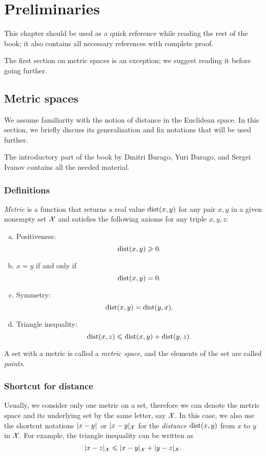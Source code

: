 \chapter*{Preliminaries}

This chapter should be used as a quick reference while reading the rest of the book;
it also contains all necessary references with complete proof.

The first section on metric spaces is an exception;
we suggest reading it before going further.

\section{Metric spaces}\label{sec:metric-spcaes}

We assume familiarity with the notion of distance in the 
Euclidean space.
In this section, we briefly discuss its generalization and fix notations that will be used further.

The introductory part of the book by Dmitri Burago, Yuri Burago, and Sergei Ivanov \cite{burago-burago-ivanov} contains all the needed material.

\subsection*{Definitions}

\emph{Metric} is a function that returns a real value $\mathop{\rm dist}\nolimits(x,y)$ for any pair $x,y$ in a given nonempty set $\mathcal{X}$  and satisfies the following axioms for any triple $x,y,z$: \label{page:def:metric}
\begin{enumerate}[(a)]
\item\label{def:metric-space:a} Positiveness: 
$$\mathop{\rm dist}\nolimits(x,y)\geqslant 0.$$
\item\label{def:metric-space:b} $x=y$ if and only if 
$$\mathop{\rm dist}\nolimits(x,y)=0.$$
\item\label{def:metric-space:c} Symmetry: $$\mathop{\rm dist}\nolimits(x, y) = \mathop{\rm dist}\nolimits(y, x).$$
\item\label{def:metric-space:d} Triangle inequality: 
$$\mathop{\rm dist}\nolimits(x, z) \leqslant \mathop{\rm dist}\nolimits(x, y) + \mathop{\rm dist}\nolimits(y, z).$$
\end{enumerate}

A set with a metric is called a \emph{metric space}, and the elements of the set are called \emph{points}.

\subsection*{Shortcut for distance}
Usually, we consider only one metric on a set, therefore we can denote the metric space and its underlying set by the same letter, say $\mathcal{X}$.
In this case, we also use the shortcut notations $\dist{x}{y}{}$ or $\dist{x}{y}{\spc{X}}$ for the {}\emph{distance} $\mathop{\rm dist}\nolimits(x,y)$ from $x$ to $y$ in $\mathcal{X}$.
For example, the triangle inequality can be written as 
$$\dist{x}{z}{\spc{X}}\le \dist{x}{y}{\spc{X}}+\dist{y}{z}{\spc{X}}.$$

